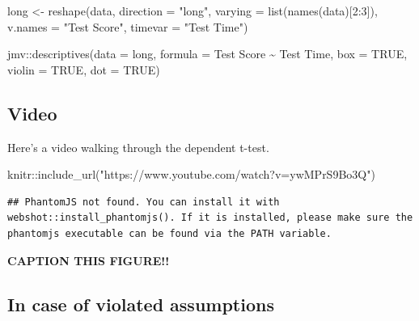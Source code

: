 \documentclass[
]{book}
\newenvironment{Shaded}{\begin{snugshade}}{\end{snugshade}}
\newcommand{\AttributeTok}[1]{\textcolor[rgb]{0.77,0.63,0.00}{#1}}
\newcommand{\ConstantTok}[1]{\textcolor[rgb]{0.00,0.00,0.00}{#1}}
\newcommand{\DecValTok}[1]{\textcolor[rgb]{0.00,0.00,0.81}{#1}}
\newcommand{\FunctionTok}[1]{\textcolor[rgb]{0.00,0.00,0.00}{#1}}
\newcommand{\NormalTok}[1]{#1}
\newcommand{\OtherTok}[1]{\textcolor[rgb]{0.56,0.35,0.01}{#1}}
\newcommand{\SpecialCharTok}[1]{\textcolor[rgb]{0.00,0.00,0.00}{#1}}
\newcommand{\StringTok}[1]{\textcolor[rgb]{0.31,0.60,0.02}{#1}}
\begin{document}
\begin{Shaded}
\begin{Highlighting}[]
\NormalTok{long }\OtherTok{\textless{}{-}} \FunctionTok{reshape}\NormalTok{(data, }
                \AttributeTok{direction =} \StringTok{"long"}\NormalTok{, }
                \AttributeTok{varying =} \FunctionTok{list}\NormalTok{(}\FunctionTok{names}\NormalTok{(data)[}\DecValTok{2}\SpecialCharTok{:}\DecValTok{3}\NormalTok{]),}
                \AttributeTok{v.names =} \StringTok{"Test Score"}\NormalTok{,}
                \AttributeTok{timevar =} \StringTok{"Test Time"}\NormalTok{)}


\NormalTok{jmv}\SpecialCharTok{::}\FunctionTok{descriptives}\NormalTok{(}\AttributeTok{data =}\NormalTok{ long,}
                  \AttributeTok{formula =} \StringTok{\textasciigrave{}}\AttributeTok{Test Score}\StringTok{\textasciigrave{}} \SpecialCharTok{\textasciitilde{}} \StringTok{\textasciigrave{}}\AttributeTok{Test Time}\StringTok{\textasciigrave{}}\NormalTok{,}
                  \AttributeTok{box =} \ConstantTok{TRUE}\NormalTok{,}
                  \AttributeTok{violin =} \ConstantTok{TRUE}\NormalTok{,}
                  \AttributeTok{dot =} \ConstantTok{TRUE}\NormalTok{)}
\end{Highlighting}
\end{Shaded}

\hypertarget{video-3}{%
\subsection{Video}\label{video-3}}

Here's a video walking through the dependent t-test.

\begin{Shaded}
\begin{Highlighting}[]
\NormalTok{knitr}\SpecialCharTok{::}\FunctionTok{include\_url}\NormalTok{(}\StringTok{"https://www.youtube.com/watch?v=ywMPrS9Bo3Q"}\NormalTok{)}
\end{Highlighting}
\end{Shaded}

\begin{verbatim}
## PhantomJS not found. You can install it with webshot::install_phantomjs(). If it is installed, please make sure the phantomjs executable can be found via the PATH variable.
\end{verbatim}

\label{fig:unnamed-chunk-2}\textbf{CAPTION THIS FIGURE!!}

\hypertarget{in-case-of-violated-assumptions-2}{%
\subsection{In case of violated assumptions}\label{in-case-of-violated-assumptions-2}}
\end{document}
